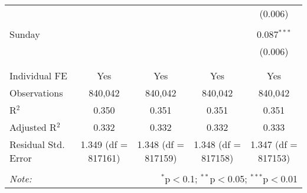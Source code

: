 \documentclass[
]{article}
\begin{document}
\begin{table}[!htbp]
{\begin{tabular}{@{\extracolsep{5pt}}lcccc}
  &  &  &  & (0.006) \\ 
  & & & & \\ 
 Sunday &  &  &  & 0.087$^{***}$ \\ 
  &  &  &  & (0.006) \\ 
  & & & & \\ 
\hline \\[-1.8ex] 
Individual FE & Yes & Yes & Yes & Yes \\ 
Observations & 840,042 & 840,042 & 840,042 & 840,042 \\ 
R$^{2}$ & 0.350 & 0.351 & 0.351 & 0.351 \\ 
Adjusted R$^{2}$ & 0.332 & 0.332 & 0.332 & 0.333 \\ 
Residual Std. Error & 1.349 (df = 817161) & 1.348 (df = 817159) & 1.348 (df = 817158) & 1.347 (df = 817153) \\ 
\hline 
\hline \\[-1.8ex] 
\textit{Note:}  & \multicolumn{4}{r}{$^{*}$p$<$0.1; $^{**}$p$<$0.05; $^{***}$p$<$0.01} \\ 
\end{tabular}
} 
\end{table} 
\newpage
\end{document}
